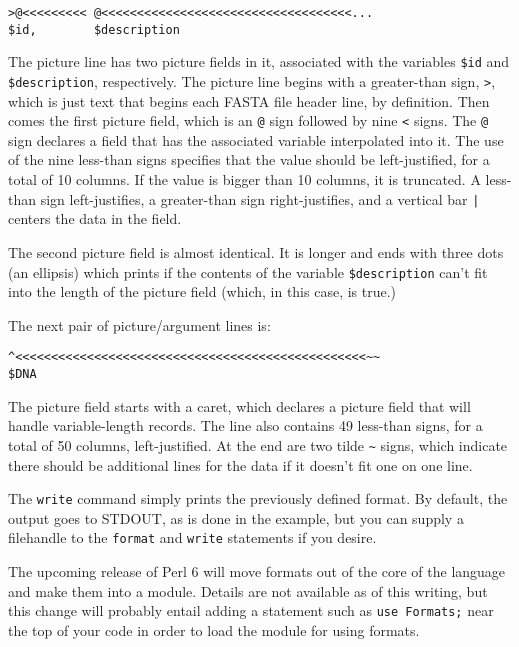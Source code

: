 \begin{lstlisting}
>@<<<<<<<<< @<<<<<<<<<<<<<<<<<<<<<<<<<<<<<<<<<<<...
$id,        $description
\end{lstlisting}

The picture line has two picture fields in it, associated with the variables \verb|$id| and \verb|$description|, respectively. The picture line begins with a greater-than sign, \verb|>|, which is just text that begins each FASTA file header line, by definition. Then comes the first picture field, which is an \verb|@| sign followed by nine \verb|<| signs. The \verb|@| sign declares a field that has the associated variable interpolated into it. The use of the nine less-than signs specifies that the value should be left-justified, for a total of 10 columns. If the value is bigger than 10 columns, it is truncated. A less-than sign left-justifies, a greater-than sign right-justifies, and a vertical bar \verb=|= centers the data in the field.

The second picture field is almost identical. It is longer and ends with three dots (an ellipsis) which prints if the contents of the variable \verb|$description| can't fit into the length of the picture field (which, in this case, is true.)

The next pair of picture/argument lines is:

\begin{lstlisting}
^<<<<<<<<<<<<<<<<<<<<<<<<<<<<<<<<<<<<<<<<<<<<<<<<<~~
$DNA
\end{lstlisting}

The picture field starts with a caret, which declares a picture field that will handle variable-length records. The line also contains 49 less-than signs, for a total of 50 columns, left-justified. At the end are two tilde \verb|~| signs, which indicate there should be additional lines for the data if it doesn't fit one on one line.

The \verb|write| command simply prints the previously defined format. By default, the output goes to STDOUT, as is done in the example, but you can supply a filehandle to the \verb|format| and \verb|write| statements if you desire.

The upcoming release of Perl 6 will move formats out of the core of the language and make them into a module. Details are not available as of this writing, but this change will probably entail adding a statement such as \verb|use Formats;| near the top of your code in order to load the module for using formats.

